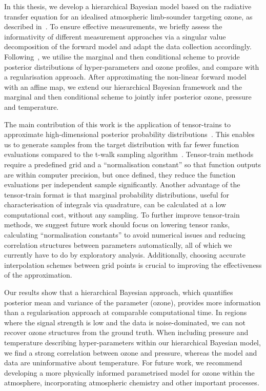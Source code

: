 In this thesis, we develop a hierarchical Bayesian model based on the radiative transfer equation for an idealised atmospheric limb-sounder targeting ozone, as described in~\cite{mipas2000handbook}.
To ensure effective measurements, we briefly assess the informativity of different measurement approaches via a singular value decomposition of the forward model and adapt the data collection accordingly.
Following~\cite{fox2016fast}, we utilise the marginal and then conditional scheme to provide posterior distributions of hyper-parameters and ozone profiles, and compare with a regularisation approach.
After approximating the non-linear forward model with an affine map, we extend our hierarchical Bayesian framework and the marginal and then conditional scheme to jointly infer posterior ozone, pressure and temperature.

The main contribution of this work is the application of tensor-trains to approximate high-dimensional posterior probability distributions~\cite{cui2022deep, dolgov2020approximation}.
This enables us to generate samples from the target distribution with far fewer function evaluations compared to the t-walk sampling algorithm~\cite{christen2010general}.
Tensor-train methods require a predefined grid and a ``normalisation constant'' so that function outputs are within computer precision, but once defined, they reduce the function evaluations per independent sample significantly.
Another advantage of the tensor-train format is that marginal probability distributions, useful for characterisation of integrals via quadrature, can be calculated at a low computational cost, without any sampling.
To further improve tensor-train methods, we suggest future work should focus on lowering tensor ranks, calculating ``normalisation constants'' to avoid numerical issues and reducing correlation structures between parameters automatically, all of which we currently have to do by exploratory analysis.
Additionally, choosing accurate interpolation schemes between grid points is crucial to improving the effectiveness of the approximation.

Our results show that a hierarchical Bayesian approach, which quantifies posterior mean and variance of the parameter (ozone), provides more information than a regularisation approach at comparable computational time.
In regions where the signal strength is low and the data is noise-dominated, we can not recover ozone structures from the ground truth.
When including pressure and temperature describing hyper-parameters within our hierarchical Bayesian model, we find a strong correlation between ozone and pressure, whereas the model and data are uninformative about temperature.
For future work, we recommend developing a more physically informed parametrised model for ozone within the atmosphere, incorporating atmospheric chemistry and other important processes.